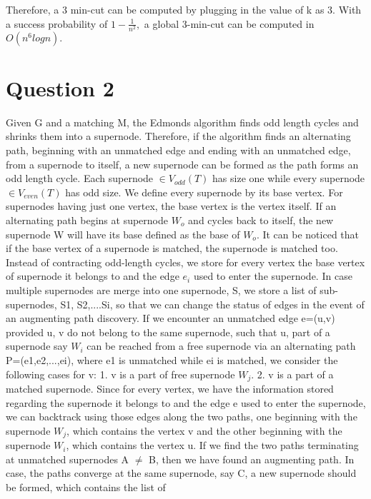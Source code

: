 \documentclass[12pt]{article}
\begin{document}
Therefore, a 3 min-cut can be computed by plugging in the value of 
k as 3. With a success probability of 
$1- \frac{1}{n^2}, $ a global 3-min-cut can be computed in 
$O(n^6logn).$

\newpage

\section{Question 2}

Given G and a matching M, the Edmonds algorithm finds odd 
length cycles and shrinks them into a supernode. Therefore, 
if the algorithm finds an alternating path, beginning with an 
unmatched edge and ending with an unmatched edge, from a supernode 
to itself, a new supernode can be formed as the path forms an odd 
length cycle. Each supernode $\in V_{odd}(T)$ has size one 
while every supernode $\in V_{even}(T)$ has odd size. We define 
every supernode by its base vertex. For supernodes having just 
one vertex, the base vertex is the vertex itself. If an alternating path 
begins at supernode $W_o$ and cycles back to itself, the new supernode W
will have its base defined as the base of $W_{o}$. It can 
be noticed that if the base vertex of a supernode is matched, the 
supernode is matched too. Instead of 
contracting odd-length cycles, we store for every vertex the base vertex of 
supernode it belongs to and the edge $e_{i}$ used to enter the 
supernode. In case multiple supernodes are merge into one supernode, S, we 
store a list of sub-supernodes, S1, S2,....Si, so that we can change the 
status of edges in the event of an augmenting path discovery. 
If we encounter an unmatched edge e=(u,v) provided u, v do not 
belong to the same supernode, such that u, part of a 
supernode say $W_i$ can be reached 
from a free supernode via an alternating path P=(e1,e2,...,ei), where
e1 is unmatched while ei is matched, we consider the following cases for v:
1. v is a part of free supernode $W_j$. 2. v is a part of a matched supernode.
Since for every vertex, we have the information stored regarding the supernode 
it belongs to and the edge e used to enter the supernode, we can backtrack using
those edges along the two paths, one beginning with the supernode $W_j$, which contains
the vertex v and the other beginning with the supernode $W_i$, which contains
the vertex u. If we find the two paths terminating at 
unmatched supernodes A $\ne$ B, then we have found an 
augmenting path. In case, the paths converge at the same supernode, say C, 
a new supernode should be formed, which contains the list of 
\end{document}
